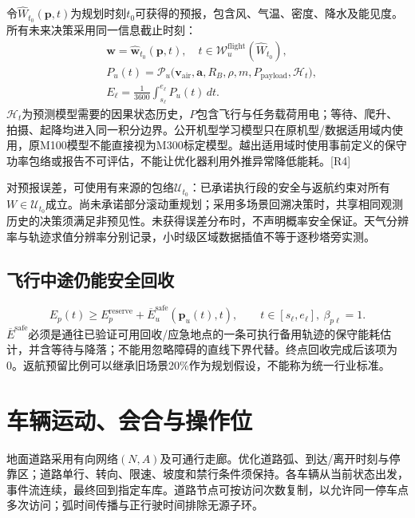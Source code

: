 \noindent 令$\widehat W_{t_0}(\mathbf p,t)$为规划时刻$t_0$可获得的预报，包含风、气温、密度、降水及能见度。所有未来决策采用同一信息截止时刻：
\begin{align}
 &\mathbf w=\widehat{\mathbf w}_{t_0}(\mathbf p,t),\quad
 t\in\mathcal W_u^{\mathrm{flight}}(\widehat W_{t_0}),\\
 &P_u(t)=\mathcal P_u\big(\mathbf v_{\mathrm{air}},\mathbf a,R_B,\rho,m,
 P_{\mathrm{payload}},\mathcal H_t\big),\\
 &E_\ell=\frac1{3600}\int_{s_\ell}^{e_\ell}P_u(t)\,dt.\label{eng:eq:power}
\end{align}
\noindent $\mathcal H_t$为预测模型需要的因果状态历史，$P$包含飞行与任务载荷用电；等待、爬升、拍摄、起降均进入同一积分边界。公开机型学习模型只在原机型/数据适用域内使用，原M100模型不能直接视为M300标定模型。越出适用域时使用事前定义的保守功率包络或报告不可评估，不能让优化器利用外推异常降低能耗。[R4]

\noindent 对预报误差，可使用有来源的包络$\mathcal U_{t_0}$：已承诺执行段的安全与返航约束对所有$W\in\mathcal U_{t_0}$成立。尚未承诺部分滚动重规划；采用多场景回溯决策时，共享相同观测历史的决策须满足非预见性。未获得误差分布时，不声明概率安全保证。天气分辨率与轨迹求值分辨率分别记录，小时级区域数据插值不等于逐秒塔旁实测。

\subsection{飞行中途仍能安全回收}
\begin{equation}
 E_p(t)\ge E_p^{\mathrm{reserve}}+
 \overline E^{\mathrm{safe}}_u(\mathbf p_u(t),t),\qquad
 t\in[s_\ell,e_\ell],\ \beta_{p\ell}=1.\label{eng:eq:return}
\end{equation}
\noindent $\overline E^{\mathrm{safe}}$必须是通往已验证可用回收/应急地点的一条可执行备用轨迹的保守能耗估计，并含等待与降落；不能用忽略障碍的直线下界代替。终点回收完成后该项为0。返航预留比例可以继承旧场景20\%作为规划假设，不能称为统一行业标准。
\clearpage

\section{车辆运动、会合与操作位}
\noindent 地面道路采用有向网络$(N,A)$及可通行走廊。优化道路弧、到达/离开时刻与停靠区；道路单行、转向、限速、坡度和禁行条件须保持。各车辆从当前状态出发，事件流连续，最终回到指定车库。道路节点可按访问次数复制，以允许同一停车点多次访问；弧时间传播与正行驶时间排除无源子环。

